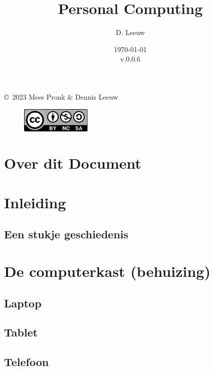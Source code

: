 \documentclass[a4paper,12pt,twoside,openright,titlepage]{book}
\author{D. Leeuw}
\title{Personal Computing}
\date{\today\\v.0.0.6}
\begin{document}

\maketitle

\copyright\ 2023 Mees Pronk \& Dennis Leeuw\\

\begin{figure}
\includegraphics[width=0.3\textwidth]{CC-BY-SA-NC.png}
\end{figure}

\bigskip




\frontmatter
\chapter{Over dit Document}



\tableofcontents


\mainmatter
\chapter{Inleiding}

\section{Een stukje geschiedenis}


\chapter{De computerkast (behuizing)}

\section{Laptop}
\section{Tablet}
\section{Telefoon}
\end{document}
